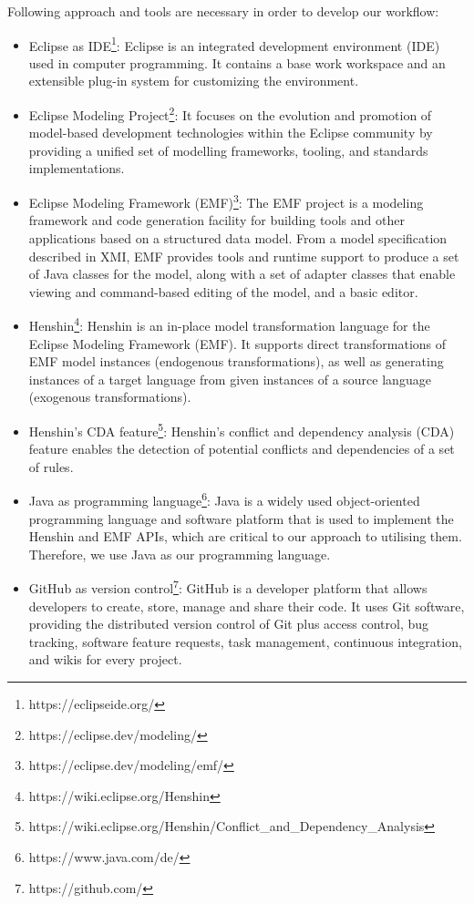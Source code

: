 Following approach and tools are necessary in order to develop our workflow:
\begin{itemize}
	\item Eclipse as IDE\footnote{https://eclipseide.org/}: Eclipse is an integrated development environment (IDE) used in computer programming. It contains a base work workspace and an extensible plug-in system for customizing the environment.
	
	\item Eclipse Modeling Project\footnote{https://eclipse.dev/modeling/}: It focuses on the evolution and promotion of model-based development technologies within the Eclipse community by providing a unified set of modelling frameworks, tooling, and standards implementations.
	
	\item Eclipse Modeling Framework (EMF)\footnote{https://eclipse.dev/modeling/emf/}: The EMF project is a modeling framework and code generation facility for building tools and other applications based on a structured data model. From a model specification described in XMI, EMF provides tools and runtime support to produce a set of Java classes for the model, along with a set of adapter classes that enable viewing and command-based editing of the model, and a basic editor.
	
	\item Henshin\footnote{https://wiki.eclipse.org/Henshin}: Henshin is an in-place model transformation language for the Eclipse Modeling Framework (EMF). It supports direct transformations of EMF model instances (endogenous transformations), as well as generating instances of a target language from given instances of a source language (exogenous transformations).
	
	\item Henshin's CDA feature\footnote{https://wiki.eclipse.org/Henshin/Conflict\_and\_Dependency\_Analysis}: Henshin's conflict and dependency analysis (CDA) feature enables the detection of potential conflicts and dependencies of a set of rules.
	
	\item Java as programming language\footnote{https://www.java.com/de/}: Java is a widely used object-oriented programming language and software platform that is used to implement the Henshin and EMF APIs, which are critical to our approach to utilising them. Therefore, we use Java as our programming language.
	
	\item GitHub as version control\footnote{https://github.com/}: GitHub is a developer platform that allows developers to create, store, manage and share their code. It uses Git software, providing the distributed version control of Git plus access control, bug tracking, software feature requests, task management, continuous integration, and wikis for every project.
\end{itemize} 
